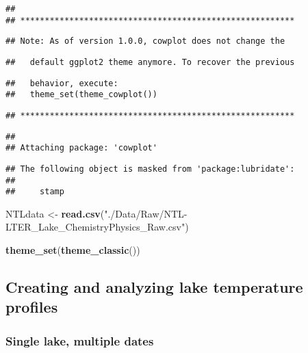 \documentclass[]{article}
\newenvironment{Shaded}{\begin{snugshade}}{\end{snugshade}}
\newcommand{\KeywordTok}[1]{\textcolor[rgb]{0.13,0.29,0.53}{\textbf{#1}}}
\newcommand{\NormalTok}[1]{#1}
\newcommand{\StringTok}[1]{\textcolor[rgb]{0.31,0.60,0.02}{#1}}
\begin{document}
\begin{verbatim}
## 
## ********************************************************
\end{verbatim}

\begin{verbatim}
## Note: As of version 1.0.0, cowplot does not change the
\end{verbatim}

\begin{verbatim}
##   default ggplot2 theme anymore. To recover the previous
\end{verbatim}

\begin{verbatim}
##   behavior, execute:
##   theme_set(theme_cowplot())
\end{verbatim}

\begin{verbatim}
## ********************************************************
\end{verbatim}

\begin{verbatim}
## 
## Attaching package: 'cowplot'
\end{verbatim}

\begin{verbatim}
## The following object is masked from 'package:lubridate':
## 
##     stamp
\end{verbatim}

\begin{Shaded}
\begin{Highlighting}[]
\NormalTok{NTLdata <-}\StringTok{ }\KeywordTok{read.csv}\NormalTok{(}\StringTok{"./Data/Raw/NTL-LTER_Lake_ChemistryPhysics_Raw.csv"}\NormalTok{)}

\KeywordTok{theme_set}\NormalTok{(}\KeywordTok{theme_classic}\NormalTok{())}
\end{Highlighting}
\end{Shaded}

\hypertarget{creating-and-analyzing-lake-temperature-profiles}{%
\subsection{Creating and analyzing lake temperature
profiles}\label{creating-and-analyzing-lake-temperature-profiles}}

\hypertarget{single-lake-multiple-dates}{%
\subsubsection{Single lake, multiple
dates}\label{single-lake-multiple-dates}}
\end{document}
